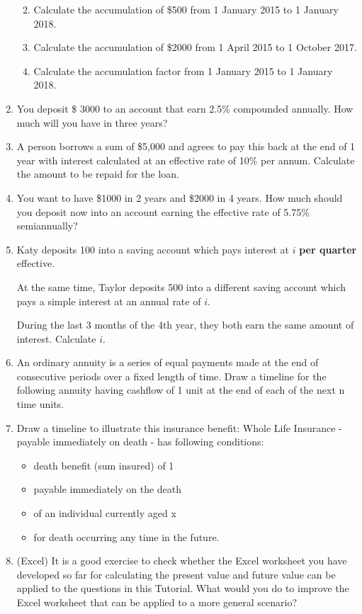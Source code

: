 \documentclass[
]{article}
\theoremstyle{definition}
\theoremstyle{definition}
\theoremstyle{definition}
\theoremstyle{definition}
\theoremstyle{remark}
\begin{document}
\begin{enumerate}
  \begin{enumerate}
  \def\labelenumii{\arabic{enumii}.}
  \item
    Calculate the accumulation of \$500 from 1 January 2015 to 1
    January 2018.
  \item
    Calculate the accumulation of \$2000 from 1 April 2015 to 1
    October 2017.
  \item
    Calculate the accumulation factor from 1 January 2015 to 1
    January 2018.
  \end{enumerate}
\item
  You deposit \$ 3000 to an account that earn 2.5\% compounded
  annually. How much will you have in three years?
\item
  A person borrows a sum of \$5,000 and agrees to pay this back at the
  end of 1 year with interest calculated at an effective rate of 10\%
  per annum. Calculate the amount to be repaid for the loan.
\item
  You want to have \$1000 in 2 years and \$2000 in 4 years. How much
  should you deposit now into an account earning the effective rate of
  5.75\% semiannually?
\item
  Katy deposits 100 into a saving account which pays interest at \(i\)
  \textbf{per quarter} effective.

  At the same time, Taylor deposits 500 into a different saving
  account which pays a simple interest at an annual rate of \(i\).

  During the last 3 months of the 4th year, they both earn the same
  amount of interest. Calculate \(i\).
\item
  An ordinary annuity is a series of equal payments made at the end of
  consecutive periods over a fixed length of time. Draw a timeline for
  the following annuity having cashflow of 1 unit at the end of each
  of the next n time units.
\item
  Draw a timeline to illustrate this insurance benefit: Whole Life
  Insurance - payable immediately on death - has following conditions:

  \begin{itemize}
  \item
    death benefit (sum insured) of 1
  \item
    payable immediately on the death
  \item
    of an individual currently aged x
  \item
    for death occurring any time in the future.
  \end{itemize}
\item
  (Excel) It is a good exercise to check whether the Excel worksheet
  you have developed so far for calculating the present value and
  future value can be applied to the questions in this Tutorial. What
  would you do to improve the Excel worksheet that can be applied to a
  more general scenario?
\end{enumerate}
\end{document}
